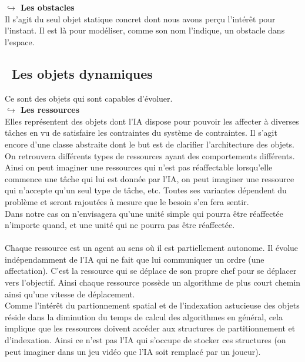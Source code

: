 \textbf{$\hookrightarrow$ Les obstacles}\\

Il s'agit du seul objet statique concret dont nous avons perçu l’intérêt pour l'instant. Il est là pour modéliser, comme son nom l'indique, un obstacle dans l'espace.

\subsection{\textbullet ~Les objets dynamiques}

Ce sont des objets qui sont capables d'évoluer.\\

\textbf{$\hookrightarrow$ Les ressources}\\

Elles représentent des objets dont l'IA dispose pour pouvoir les affecter à diverses tâches en vu de satisfaire les contraintes du système de contraintes. Il s'agit encore d'une classe abstraite dont le but est de clarifier l'architecture des objets. On retrouvera différents types de ressources ayant des comportements différents.\\

Ainsi on peut imaginer une ressources qui n'est pas réaffectable lorsqu'elle commence une tâche qui lui est donnée par l'IA, on peut imaginer une ressource qui n'accepte qu'un seul type de tâche, etc. Toutes ses variantes dépendent du problème et seront rajoutées à mesure que le besoin s'en fera sentir.\\
\indent Dans notre cas on n'envisagera qu'une unité simple qui pourra être réaffectée n'importe quand, et une unité qui ne pourra pas être réaffectée.\\\\

Chaque ressource est un agent au sens où il est partiellement autonome. Il évolue indépendamment de l'IA qui ne fait que lui communiquer un ordre (une affectation). C'est la ressource qui se déplace de son propre chef pour se déplacer vers l'objectif. Ainsi chaque ressource possède un algorithme de plus court chemin ainsi qu'une vitesse de déplacement.\\
Comme l'intérêt du partionnement spatial et de l'indexation astucieuse des objets réside dans la diminution du temps de calcul des algorithmes en général, cela implique que les ressources doivent accéder aux structures de partitionnement et d'indexation. Ainsi ce n'est pas l'IA qui s'occupe de stocker ces structures (on peut imaginer dans un jeu vidéo que l'IA soit remplacé par un joueur).

